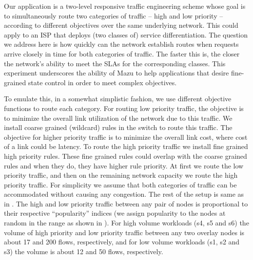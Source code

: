 Our application is a two-level responsive traffic engineering scheme
whose goal is to simultaneously route two categories of traffic --
high and low priority --
according to different objectives over the same underlying network.
This could apply to an ISP that deploys (two classes of) service
differentiation. The question we address here is how quickly can the network
establish routes when requests arrive closely in time for both
categories of traffic. The faster this is, the
closer the network's ability to meet the SLAs for the corresponding
classes. This experiment underscores the ability of Mazu to
help applications that desire fine-grained state control in order
to meet complex objectives.


To emulate this, in a somewhat simplistic fashion, we use different objective functions to route each category. For routing low priority traffic, the 
objective is to minimize the overall link utilization of the network due to this traffic. We install coarse grained (wildcard) rules in the switch 
to route this traffic. The objective for higher priority traffic is to minimize the overall link cost, where cost of a link could be  latency. To route the high priority traffic we install fine grained high priority rules. These fine grained rules could overlap with the coarse 
grained rules and when they do, they have higher rule priority. At first we
route the low priority traffic, and then on the remaining network capacity we route the high priority traffic. For simplicity we assume that both categories of traffic can be 
accommodated without causing any congestion. The rest of the setup is same as
in . The high and low priority traffic 
between any pair of nodes is proportional to their respective ``popularity'' indices (we assign popularity to the nodes at random 
in the range as shown in ). For high volume workloads (s4, s5 and s6) the volume of high priority and low priority traffic between any two 
overlay nodes is about 17 and 200 flows, respectively, and for low volume
workloads (s1, s2 and s3) the volume is about 12 and 50 flows, respectively.






